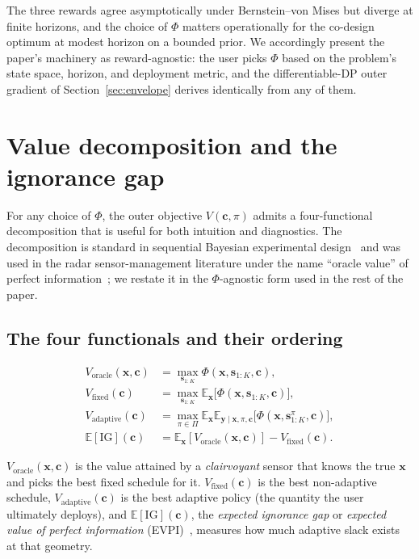 \documentclass[11pt,a4paper,onecolumn]{article}
\newcommand{\E}{\mathbb{E}}
\newcommand{\bx}{\bm{x}}
\newcommand{\bc}{\bm{c}}
\newcommand{\bs}{\bm{s}}
\newcommand{\by}{\bm{y}}
\begin{document}
The three rewards agree asymptotically under Bernstein--von Mises but diverge at finite horizons, and the choice of $\Phi$ matters operationally for the co-design optimum at modest horizon on a bounded prior.  We accordingly present the paper's machinery as reward-agnostic: the user picks $\Phi$ based on the problem's state space, horizon, and deployment metric, and the differentiable-DP outer gradient of Section~\ref{sec:envelope} derives identically from any of them.

\section{Value decomposition and the ignorance gap}
\label{sec:decomposition}

For any choice of $\Phi$, the outer objective $V(\bc, \pi)$ admits a four-functional decomposition that is useful for both intuition and diagnostics.  The decomposition is standard in sequential Bayesian experimental design~\cite{huan2016sequential, shen2023bayesian} and was used in the radar sensor-management literature under the name ``oracle value'' of perfect information~\cite{kreucher2005kastella, kastella1997discrimination}; we restate it in the $\Phi$-agnostic form used in the rest of the paper.

\subsection{The four functionals and their ordering}
\label{sec:four_functionals}

\begin{align}
V_{\text{oracle}}(\bx, \bc) &= \max_{\bs_{1:K}} \Phi(\bx, \bs_{1:K}, \bc), \label{eq:Voracle}\\
V_{\text{fixed}}(\bc)       &= \max_{\bs_{1:K}} \E_{\bx}\!\bigl[\Phi(\bx, \bs_{1:K}, \bc)\bigr], \label{eq:Vfixed}\\
V_{\text{adaptive}}(\bc)    &= \max_{\pi \in \Pi} \E_{\bx} \E_{\by\mid\bx, \pi, \bc}\!\bigl[\Phi(\bx, \bs_{1:K}^\pi, \bc)\bigr], \label{eq:Vadaptive}\\
\E[\mathrm{IG}](\bc)        &= \E_{\bx}[V_{\text{oracle}}(\bx, \bc)] - V_{\text{fixed}}(\bc). \label{eq:EIG}
\end{align}

$V_{\text{oracle}}(\bx, \bc)$ is the value attained by a \emph{clairvoyant} sensor that knows the true $\bx$ and picks the best fixed schedule for it.  $V_{\text{fixed}}(\bc)$ is the best non-adaptive schedule, $V_{\text{adaptive}}(\bc)$ is the best adaptive policy (the quantity the user ultimately deploys), and $\E[\mathrm{IG}](\bc)$, the \emph{expected ignorance gap} or \emph{expected value of perfect information} (EVPI)~\cite{howard1966decision, raiffa1961applied}, measures how much adaptive slack exists at that geometry.
\end{document}
